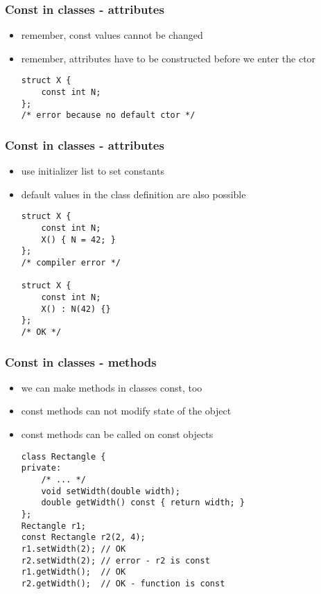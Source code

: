 \begin{frame}[fragile]
    \frametitle{Const in classes - attributes}
    \begin{itemize}
    \item remember, const values cannot be changed
    \item remember, attributes have to be constructed before we enter the ctor
    \begin{lstlisting}[numbers=none]
struct X {
    const int N;
};
/* error because no default ctor */
    \end{lstlisting}
    \end{itemize}
\end{frame}

\begin{frame}[fragile]
    \frametitle{Const in classes - attributes}
    \begin{itemize}
    \item use initializer list to set constants
    \item default values in the class definition are also possible
    \begin{lstlisting}[numbers=none]
struct X {
    const int N;
    X() { N = 42; }
};
/* compiler error */

struct X {
    const int N;
    X() : N(42) {}
};
/* OK */
    \end{lstlisting}
    \end{itemize}
\end{frame}

\begin{frame}[fragile]
    \frametitle{Const in classes - methods}
    \begin{itemize}
    \item we can make methods in classes const, too
    \item const methods can not modify state of the object
    \item const methods can be called on const objects
    \begin{lstlisting}[numbers=none]
class Rectangle {
private:
    /* ... */
    void setWidth(double width);
    double getWidth() const { return width; }
};
Rectangle r1;
const Rectangle r2(2, 4);
r1.setWidth(2); // OK
r2.setWidth(2); // error - r2 is const
r1.getWidth();  // OK
r2.getWidth();  // OK - function is const
    \end{lstlisting}
    \end{itemize}
\end{frame}

